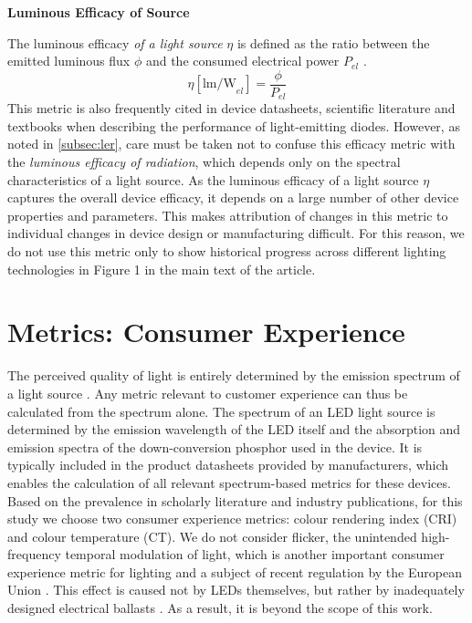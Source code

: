 \documentclass[parskip=full]{article}
\begin{document}
\textbf{Luminous Efficacy of Source}
\label{subsec:les}

The luminous efficacy \textit{of a light source} $\eta$ is defined as the ratio between the emitted luminous flux $\phi$ and the consumed electrical power $P_{el}$ \cite{cie-term-effsrc}.
%
\begin{equation}
    \eta [\text{lm/W}_{el}]= \frac{\phi}{P_{el}}
\end{equation}
%
This metric is also frequently cited in device datasheets, scientific literature and textbooks when describing the performance of light-emitting diodes. However, as noted in \cref{subsec:ler}, care must be taken not to confuse this efficacy metric with the \textit{luminous efficacy of radiation}, which depends only on the spectral characteristics of a light source. As the luminous efficacy of a light source $\eta$ captures the overall device efficacy, it depends on a large number of other device properties and parameters. This makes attribution of changes in this metric to individual changes in device design or manufacturing difficult. For this reason, we do not use this metric only to show historical progress across different lighting technologies in Figure 1 in the main text of the article.

\clearpage
\section{Metrics: Consumer Experience}

The perceived quality of light is entirely determined by the emission spectrum of a light source \cite{ies_handbook}. Any metric relevant to customer experience can thus be calculated from the spectrum alone. The spectrum of an LED light source is determined by the emission wavelength of the LED itself and the absorption and emission spectra of the down-conversion phosphor used in the device. It is typically included in the product datasheets provided by manufacturers, which enables the calculation of all relevant spectrum-based metrics for these devices. Based on the prevalence in scholarly literature and industry publications, for this study we choose two consumer experience metrics: colour rendering index (CRI) and colour temperature (CT). We do not consider flicker, the unintended high-frequency temporal modulation of light, which is another important consumer experience metric for lighting and a subject of recent regulation by the European Union \cite{weinold2020long}. This effect is caused not by LEDs themselves, but rather by inadequately designed electrical ballasts \cite{Lehman2014}. As a result, it is beyond the scope of this work. 
\end{document}
